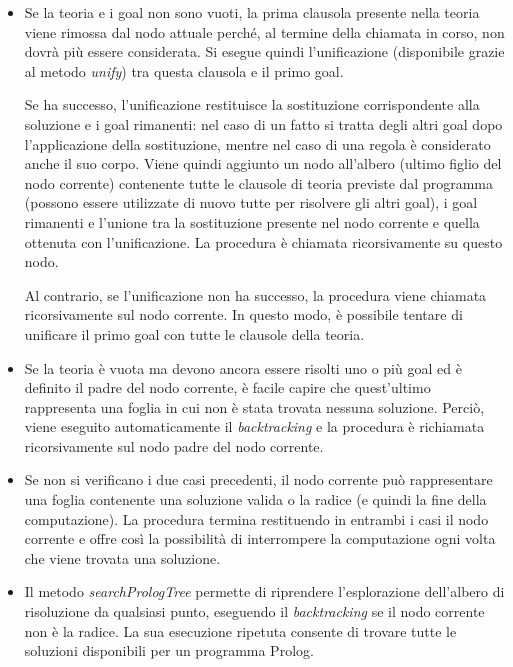 \begin{itemize}
\item Se la teoria e i goal non sono vuoti, la prima clausola presente nella teoria viene rimossa dal nodo attuale perché, al termine della chiamata in corso, non dovrà più essere considerata. Si esegue quindi l'unificazione (disponibile grazie al metodo \textit{unify}) tra questa clausola e il primo goal.

Se ha successo, l'unificazione restituisce la sostituzione corrispondente alla soluzione e i goal rimanenti: nel caso di un fatto si tratta degli altri goal dopo l'applicazione della sostituzione, mentre nel caso di una regola è considerato anche il suo corpo. Viene quindi aggiunto un nodo all'albero (ultimo figlio del nodo corrente) contenente tutte le clausole di teoria previste dal programma (possono essere utilizzate di nuovo tutte per risolvere gli altri goal), i goal rimanenti e l'unione tra la sostituzione presente nel nodo corrente e quella ottenuta con l'unificazione. La procedura è chiamata ricorsivamente su questo nodo.

Al contrario, se l'unificazione non ha successo, la procedura viene chiamata ricorsivamente sul nodo corrente. In questo modo, è possibile tentare di unificare il primo goal con tutte le clausole della teoria.
\item Se la teoria è vuota ma devono ancora essere risolti uno o più goal ed è definito il padre del nodo corrente, è facile capire che quest'ultimo rappresenta una foglia in cui non è stata trovata nessuna soluzione. Perciò, viene eseguito automaticamente il \textit{backtracking} e la procedura è richiamata ricorsivamente sul nodo padre del nodo corrente.
\item Se non si verificano i due casi precedenti, il nodo corrente può rappresentare una foglia contenente una soluzione valida o la radice (e quindi la fine della computazione). La procedura termina restituendo in entrambi i casi il nodo corrente e offre così la possibilità di interrompere la computazione ogni volta che viene trovata una soluzione.
\item Il metodo \textit{searchPrologTree} permette di riprendere l'esplorazione dell'albero di risoluzione da qualsiasi punto, eseguendo il \textit{backtracking} se il nodo corrente non è la radice. La sua esecuzione ripetuta consente di trovare tutte le soluzioni disponibili per un programma Prolog.
\end{itemize}



